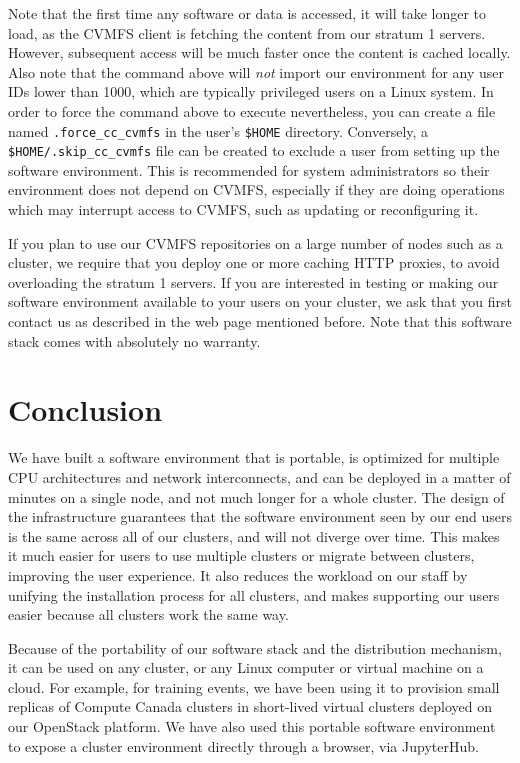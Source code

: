\documentclass[sigconf]{acmart}
\begin{document}
Note that the first time any software or data is accessed, it will take longer to load, as the CVMFS client is fetching the content from our stratum 1 servers. However, subsequent access will be much faster once the content is cached locally. 
Also note that the command above will {\it not} import our environment for any user IDs lower than 1000, which are typically privileged users on a Linux system. In order to force the command above to execute nevertheless, you can create a file named \texttt{.force\_cc\_cvmfs} in the user's \texttt{\$HOME} directory. Conversely, a \texttt{\$HOME/.skip\_cc\_cvmfs} file can be created to exclude a user from setting up the software environment. This is recommended for system administrators so their environment does not depend on CVMFS, especially if they are doing operations which may interrupt access to CVMFS, such as updating or reconfiguring it.

If you plan to use our CVMFS repositories on a large number of nodes such as a cluster, we require that you deploy one or more caching HTTP proxies, to avoid overloading the stratum 1 servers. If you are interested in testing or making our software environment available to your users on your cluster, we ask that you first contact us as described in the web page mentioned before. Note that this software stack comes with absolutely no warranty. 

\section{Conclusion}
\label{sec:Conclusion}
We have built a software environment that is portable, is optimized for multiple CPU architectures and network interconnects, and can be deployed in a matter of minutes on a single node, and not much longer for a whole cluster. The design of the infrastructure guarantees that the software environment seen by our end users is the same across all of our clusters, and will not diverge over time. This makes it much easier for users to use multiple clusters or migrate between clusters, improving the user experience. It also reduces the workload on our staff by unifying the installation process for all clusters, and makes supporting our users easier because all clusters work the same way.

Because of the portability of our software stack and the distribution mechanism, it can be used on any cluster, or any Linux computer or virtual machine on a cloud. For example, for training events, we have been using it to provision small replicas of Compute Canada clusters in short-lived virtual clusters deployed on our OpenStack platform. We have also used this portable software environment to expose a cluster environment directly through a browser, via JupyterHub. 
\end{document}
